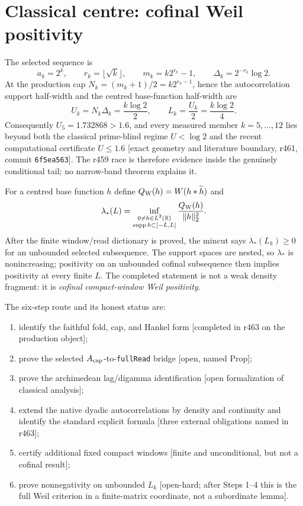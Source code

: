 \documentclass[11pt]{article}
\theoremstyle{remark}
\newcommand{\R}{\mathbb{R}}
\newcommand{\gr}[1]{\textnormal{\small[#1]}}
\begin{document}
\section{Classical centre: cofinal Weil positivity}\label{sec:r461}

The selected sequence is
\[
a_{k}=2^{k},\qquad r_{k}=\lfloor\sqrt{k}\rfloor,\qquad
m_{k}=k2^{r_{k}}-1,\qquad
\Delta_{k}=2^{-r_{k}}\log2 .
\]
At the production cap
$N_{k}=(m_{k}+1)/2=k2^{r_{k}-1}$, hence the autocorrelation support
half-width and the centred base-function half-width are
\[
U_{k}=N_{k}\Delta_{k}=\frac{k\log2}{2},
\qquad L_{k}=\frac{U_{k}}2=\frac{k\log2}{4}.
\]
Consequently $U_{5}=1.732868>1.6$, and every measured member
$k=5,\ldots,12$ lies beyond both the classical prime-blind regime
$U<\log2$ and the recent computational certificate $U\le1.6$
\gr{exact geometry and literature boundary, r461,
commit \texttt{6f5ea563}}.  The r459 race is therefore evidence
inside the genuinely conditional tail; no narrow-band theorem
explains it.

For a centred base function $h$ define
$Q_{\rm W}(h)=W(h*\widetilde h)$ and
\[
\lambda_{*}(L)=
\inf_{\substack{0\ne h\in L^{2}(\R)\\
\operatorname{supp}h\subset[-L,L]}}
\frac{Q_{\rm W}(h)}{\|h\|_{2}^{2}}.
\]
After the finite window/read dictionary is proved, the mincut says
$\lambda_{*}(L_{k})\ge0$ for an unbounded selected subsequence.
The support spaces are nested, so $\lambda_{*}$ is nonincreasing;
positivity on an unbounded cofinal subsequence then implies
positivity at every finite $L$.  The completed statement is not a
weak density fragment: it is \emph{cofinal compact-window Weil
positivity}.

The six-step route and its honest status are:
\begin{enumerate}
\item identify the faithful fold, cap, and Hankel form
      \gr{completed in r463 on the production object};
\item prove the selected $A_{\rm cap}$-to-\texttt{fullRead} bridge
      \gr{open, named Prop};
\item prove the archimedean lag/digamma identification
      \gr{open formalization of classical analysis};
\item extend the native dyadic autocorrelations by density and
      continuity and identify the standard explicit formula
      \gr{three external obligations named in r463};
\item certify additional fixed compact windows
      \gr{finite and unconditional, but not a cofinal result};
\item prove nonnegativity on unbounded $L_{k}$
      \gr{open-hard; after Steps 1--4 this is the full Weil
      criterion in a finite-matrix coordinate, not a subordinate
      lemma}.
\end{enumerate}
\end{document}
